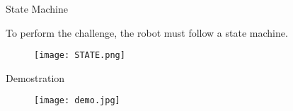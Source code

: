 \begin{frame}[c]{State Machine}

   To perform the challenge, the robot must follow a state machine.

     \begin{center}
            \begin{figure}
                \texttt{[image: STATE.png]}
            \end{figure}
    \end{center}


\end{frame}



\begin{frame}[c]{Demostration}

    \begin{figure}
        \texttt{[image: demo.jpg]}
    \end{figure}
 
 \end{frame}
%   
%    
%   


